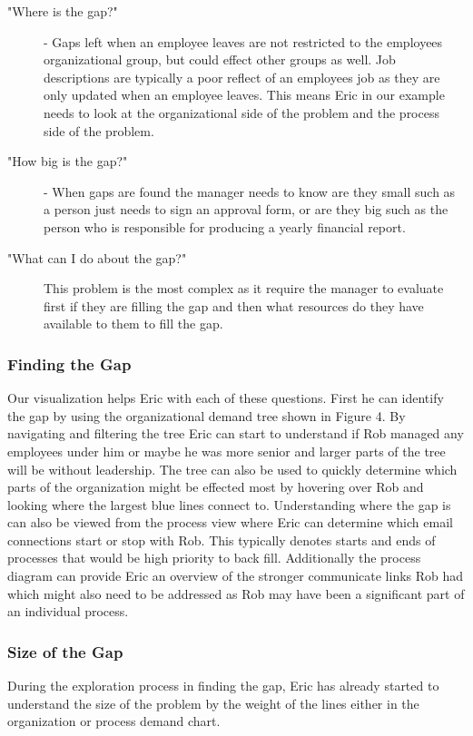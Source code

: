 \message{ !name(FinalPaper.tex)}\documentclass[journal]{vgtc}                %
\begin{document}
\begin{description}
	\item ["Where is the gap?"] - Gaps left when an employee leaves are not restricted to the employees organizational group, but could effect other groups as well.  Job descriptions are typically a poor reflect of an employees job as they are only updated when an employee leaves.  This means Eric in our example needs to look at the organizational side of the problem and the process side of the problem.
	\item ["How big is the gap?"] - When gaps are found the manager needs to know are they small such as a person just needs to sign an approval form, or are they big such as the person who is responsible for producing a yearly financial report.
	\item ["What can I do about the gap?"] This problem is the most complex as it require the manager to evaluate first if they are filling the gap and then what resources do they have available to them to fill the gap.
\end{description}

\subsubsection{Finding the Gap}
Our visualization helps Eric with each of these questions.  First he can identify the gap by using the organizational demand tree shown in Figure 4.  By navigating and filtering the tree Eric can start to understand if Rob managed any employees under him or maybe he was more senior and larger parts of the tree will be without leadership.  The tree can also be used to quickly determine which parts of the organization might be effected most by hovering over Rob and looking where the largest blue lines connect to.
Understanding where the gap is can also be viewed from the process view where Eric can determine which email connections start or stop with Rob.  This typically denotes starts and ends of processes that would be high priority to back fill.  Additionally the process diagram can provide Eric an overview of the stronger communicate links Rob had which might also need to be addressed as Rob may have been a significant part of an individual process.

\subsubsection{Size of the Gap}
During the exploration process in finding the gap, Eric has already started to understand the size of the problem by the weight of the lines either in the organization or process demand chart.
\end{document}
